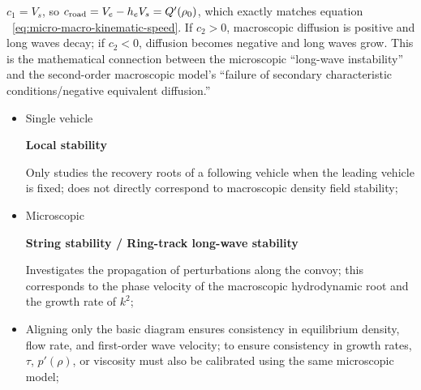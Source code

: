 \documentclass[11pt,a4paper,openany]{book}
\numberwithin{equation}{chapter}
\numberwithin{figure}{chapter}
\numberwithin{table}{chapter}
\begin{document}
$c_1=V_s$, so $c_{\rm road}=V_e-h_eV_s=Q'(\rho_0)$, which exactly matches equation ~\eqref{eq:micro-macro-kinematic-speed}. If $c_2>0$, macroscopic diffusion is positive and long waves decay; if $c_2<0$, diffusion becomes negative and long waves grow. This is the mathematical connection between the microscopic “long-wave instability” and the second-order macroscopic model’s “failure of secondary characteristic conditions/negative equivalent diffusion.”





\begin{tcolorbox}[keybox,title=\textbf{Which stabilizations can be mapped to, and which cannot be directly mapped to?}]
\begin{itemize}[leftmargin=1.4em,itemsep=3pt]
\item




Single vehicle




\textbf{Local stability}




Only studies the recovery roots of a following vehicle when the leading vehicle is fixed; does not directly correspond to macroscopic density field stability;







\item




 Microscopic




\textbf{String stability / Ring-track long-wave stability}




Investigates the propagation of perturbations along the convoy; this corresponds to the phase velocity of the macroscopic hydrodynamic root and the growth rate of $k^2$;







\item




Aligning only the basic diagram ensures consistency in equilibrium density, flow rate, and first-order wave velocity; to ensure consistency in growth rates, $\tau$, $p'(\rho)$, or viscosity must also be calibrated using the same microscopic model;








\end{itemize}
\end{tcolorbox}
\end{document}

